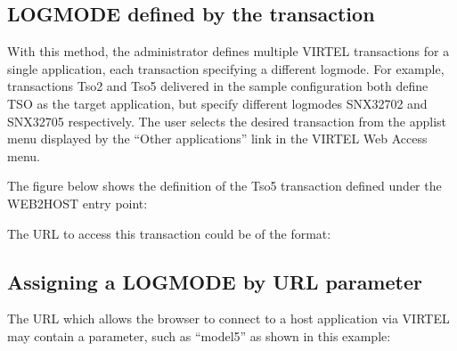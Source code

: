 \documentclass[letterpaper,10pt,english]{sphinxmanual}
\begin{document}
\ignorespaces 

\subsection{LOGMODE defined by the transaction}
\label{\detokenize{Customization:logmode-defined-by-the-transaction}}\label{\detokenize{Customization:index-61}}
With this method, the administrator defines multiple VIRTEL transactions for a single application, each transaction specifying a different logmode. For example, transactions Tso2 and Tso5 delivered in the sample configuration both define TSO as the target application, but specify different logmodes SNX32702 and SNX32705 respectively. The user selects the desired transaction from the applist menu displayed by the “Other applications” link in the VIRTEL Web Access menu.

The figure below shows the definition of the Tso5 transaction defined under the WEB2HOST entry point:



The URL to access this transaction could be of the format:

\begin{sphinxVerbatim}[commandchars=\\\{\}]
\end{sphinxVerbatim}

\ignorespaces 

\subsection{Assigning a LOGMODE by URL parameter}
\label{\detokenize{Customization:assigning-a-logmode-by-url-parameter}}\label{\detokenize{Customization:index-62}}
The URL which allows the browser to connect to a host application via VIRTEL may contain a parameter, such as “model5” as shown in this example:
\end{document}
